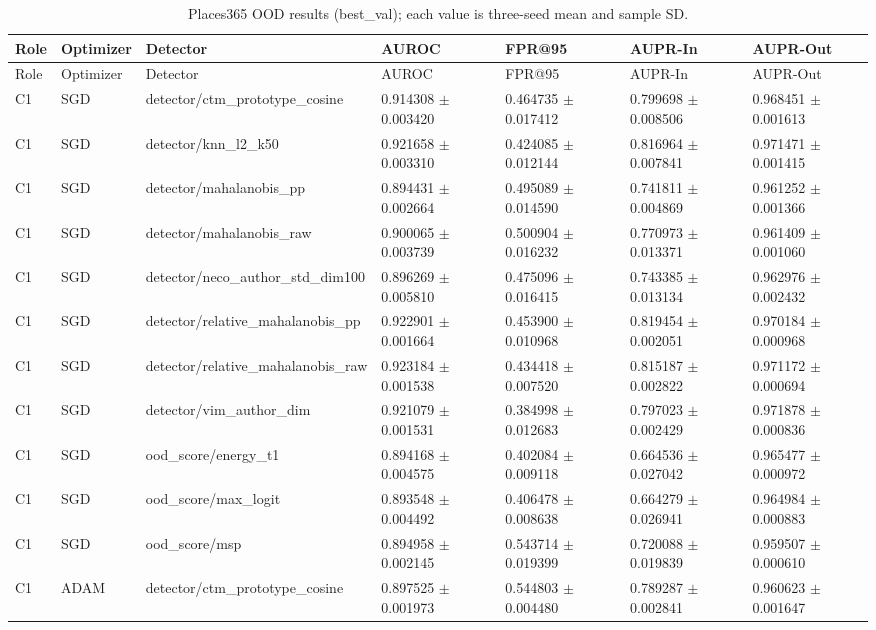 \begin{longtable}{lllllll}
\caption{Places365 OOD results (best\_val); each value is three-seed mean and sample SD.}\\
Role & Optimizer & Detector & AUROC & FPR@95 & AUPR-In & AUPR-Out \\
\hline
\endfirsthead
Role & Optimizer & Detector & AUROC & FPR@95 & AUPR-In & AUPR-Out \\
\hline
\endhead
C1 & SGD & detector/ctm\_prototype\_cosine & 0.914308 $\pm$ 0.003420 & 0.464735 $\pm$ 0.017412 & 0.799698 $\pm$ 0.008506 & 0.968451 $\pm$ 0.001613 \\
C1 & SGD & detector/knn\_l2\_k50 & 0.921658 $\pm$ 0.003310 & 0.424085 $\pm$ 0.012144 & 0.816964 $\pm$ 0.007841 & 0.971471 $\pm$ 0.001415 \\
C1 & SGD & detector/mahalanobis\_pp & 0.894431 $\pm$ 0.002664 & 0.495089 $\pm$ 0.014590 & 0.741811 $\pm$ 0.004869 & 0.961252 $\pm$ 0.001366 \\
C1 & SGD & detector/mahalanobis\_raw & 0.900065 $\pm$ 0.003739 & 0.500904 $\pm$ 0.016232 & 0.770973 $\pm$ 0.013371 & 0.961409 $\pm$ 0.001060 \\
C1 & SGD & detector/neco\_author\_std\_dim100 & 0.896269 $\pm$ 0.005810 & 0.475096 $\pm$ 0.016415 & 0.743385 $\pm$ 0.013134 & 0.962976 $\pm$ 0.002432 \\
C1 & SGD & detector/relative\_mahalanobis\_pp & 0.922901 $\pm$ 0.001664 & 0.453900 $\pm$ 0.010968 & 0.819454 $\pm$ 0.002051 & 0.970184 $\pm$ 0.000968 \\
C1 & SGD & detector/relative\_mahalanobis\_raw & 0.923184 $\pm$ 0.001538 & 0.434418 $\pm$ 0.007520 & 0.815187 $\pm$ 0.002822 & 0.971172 $\pm$ 0.000694 \\
C1 & SGD & detector/vim\_author\_dim & 0.921079 $\pm$ 0.001531 & 0.384998 $\pm$ 0.012683 & 0.797023 $\pm$ 0.002429 & 0.971878 $\pm$ 0.000836 \\
C1 & SGD & ood\_score/energy\_t1 & 0.894168 $\pm$ 0.004575 & 0.402084 $\pm$ 0.009118 & 0.664536 $\pm$ 0.027042 & 0.965477 $\pm$ 0.000972 \\
C1 & SGD & ood\_score/max\_logit & 0.893548 $\pm$ 0.004492 & 0.406478 $\pm$ 0.008638 & 0.664279 $\pm$ 0.026941 & 0.964984 $\pm$ 0.000883 \\
C1 & SGD & ood\_score/msp & 0.894958 $\pm$ 0.002145 & 0.543714 $\pm$ 0.019399 & 0.720088 $\pm$ 0.019839 & 0.959507 $\pm$ 0.000610 \\
C1 & ADAM & detector/ctm\_prototype\_cosine & 0.897525 $\pm$ 0.001973 & 0.544803 $\pm$ 0.004480 & 0.789287 $\pm$ 0.002841 & 0.960623 $\pm$ 0.001647 \\

\end{longtable}
